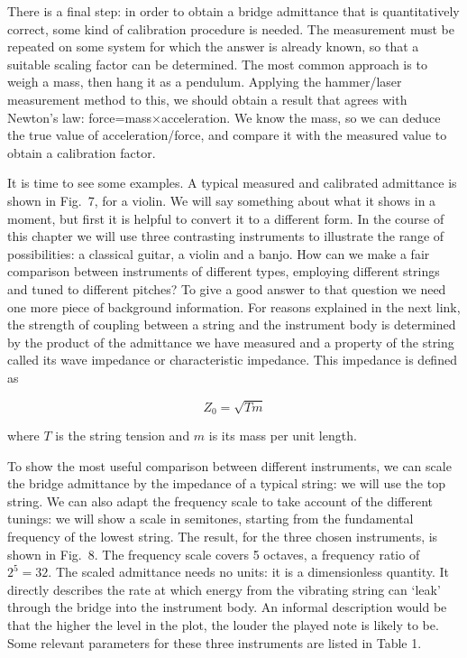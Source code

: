   There is a final step: in order to obtain a bridge admittance that is 
  quantitatively correct, some kind of calibration procedure is needed. The 
  measurement must be repeated on some system for which the answer is already 
  known, so that a suitable scaling factor can be determined. The most common 
  approach is to weigh a mass, then hang it as a pendulum. Applying the 
  hammer/laser measurement method to this, we should obtain a result that 
  agrees with Newton's law: force=mass$\times$acceleration. We know the mass, 
  so we can deduce the true value of acceleration/force, and compare it with 
  the measured value to obtain a calibration factor. 

  It is time to see some examples. A typical measured and calibrated admittance 
  is shown in Fig.\ 7, for a violin. We will say something about what it shows 
  in a moment, but first it is helpful to convert it to a different form. In 
  the course of this chapter we will use three contrasting instruments to 
  illustrate the range of possibilities: a classical guitar, a violin and a 
  banjo. How can we make a fair comparison between instruments of different 
  types, employing different strings and tuned to different pitches? To give a 
  good answer to that question we need one more piece of background 
  information. For reasons explained in the next link, the strength of coupling 
  between a string and the instrument body is determined by the product of the 
  admittance we have measured and a property of the string called its wave 
  impedance or characteristic impedance. This impedance is defined as 

  \begin{equation*}Z_0=\sqrt{T m}\end{equation*} 

  \noindent{}where $T$ is the string tension and $m$ is its mass per unit 
  length. 


  To show the most useful comparison between different instruments, we can 
  scale the bridge admittance by the impedance of a typical string: we will use 
  the top string. We can also adapt the frequency scale to take account of the 
  different tunings: we will show a scale in semitones, starting from the 
  fundamental frequency of the lowest string. The result, for the three chosen 
  instruments, is shown in Fig.\ 8. The frequency scale covers 5 octaves, a 
  frequency ratio of $2^5=32$. The scaled admittance needs no units: it is a 
  dimensionless quantity. It directly describes the rate at which energy from 
  the vibrating string can `leak' through the bridge into the instrument body. 
  An informal description would be that the higher the level in the plot, the 
  louder the played note is likely to be. Some relevant parameters for these 
  three instruments are listed in Table 1. 

